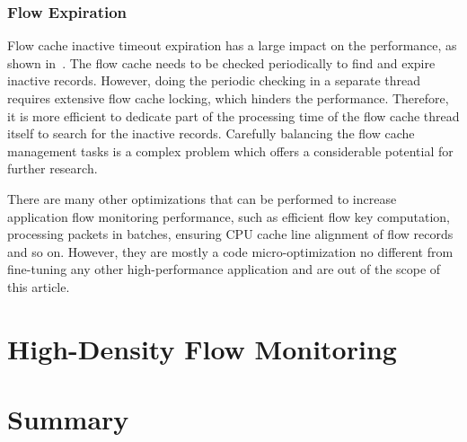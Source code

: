 \subsubsection{Flow Expiration}
Flow cache inactive timeout expiration has a large impact on the performance, as shown in~\cite{Rodriguez-2013-Empirical, Molina-2006-Design}. The flow cache needs to be checked periodically to find and expire inactive records. However, doing the periodic checking in a separate thread requires extensive flow cache locking, which hinders the performance. Therefore, it is more efficient to dedicate part of the processing time of the flow cache thread itself to search for the inactive records. Carefully balancing the flow cache management tasks is a complex problem which offers a considerable potential for further research.

There are many other optimizations that can be performed to increase application flow monitoring performance, such as efficient flow key computation, processing packets in batches, ensuring CPU cache line alignment of flow records and so on. However, they are mostly a code micro-optimization no different from fine-tuning any other high-performance application and are out of the scope of this article.




\section{High-Density Flow Monitoring}\label{sec:performance-high-density}

\section{Summary}\label{sec:performance-summary}